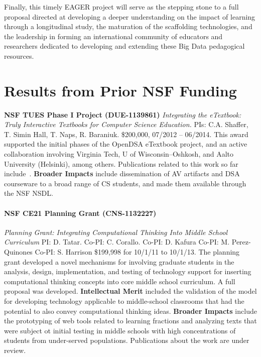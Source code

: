 \documentclass[11pt]{article}
\begin{document}
Finally, this timely EAGER project will serve as the stepping stone to a full proposal directed at developing a deeper understanding on the impact of learning through a longitudinal study, the maturation of the scaffolding technologies, and the leadership in forming an international community of educators and researchers dedicated to developing and extending these Big Data pedagogical resources.

\section{Results from Prior NSF Funding}

\textbf{NSF TUES Phase I Project (DUE-1139861)}
\emph{Integrating the eTextbook: Truly Interactive Textbooks for Computer Science Education.} PIs: C.A. Shaffer, T. Simin Hall, T. Naps,
R. Baraniuk.
\$200,000, 07/2012 -- 06/2014.
This award supported the initial phases of the OpenDSA eTextbook
project, and an active collaboration involving Virginia Tech, U of
Wisconsin--Oshkosh, and Aalto University (Helsinki), among others.
Publications related to this work so far
include~\cite{ShafferSIGCSE11,ShafferPVW11,ShafferKoli11,Fouh:AV12,KorhonenWG13,Karavirta:ITiCSE13,Hall13,Fouh14}.
\textbf{Broader Impacts}
include dissemination of AV artifacts and DSA courseware to a broad
range of CS students, and made them available through the NSF NSDL.

\paragraph{NSF CE21 Planning Grant (CNS-1132227)}
\emph{Planning Grant: Integrating Computational Thinking Into Middle School Curriculum}
PI: D. Tatar.
Co-PI: C. Corallo.
Co-PI: D. Kafura
Co-PI: M. Perez-Quinones
Co-PI: S. Harrison
\$199,998 for 10/1/11 to 10/1/13.
The planning grant developed a novel mechanisms for involving graduate students in the analysis, design, implementation, and testing of technology support for inserting computational thinking concepts into core middle school curriculum. A full proposal was developed. \textbf{Intellectual Merit} included the validation of the model for developing technology applicable to middle-school classrooms that had the potential to also convey computational thinking ideas.  \textbf{Broader Impacts} include the prototyping of web tools related to learning fractions and analyzing texts that were subject ot initial testing in middle schools with high concentrations of students from under-served populations. Publications about the work are under review.
\end{document}
